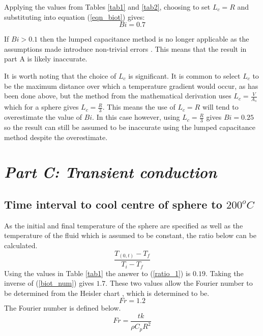 \documentclass[11pt]{article}
\begin{document}
Applying the values from Tables \ref{tab1} and \ref{tab2}, choosing to set $L_{c}=R$ and substituting into equation (\ref{eqn_biot}) gives:
\begin{equation}\label{biot_num}
	Bi = 0.7
\end{equation}

If $Bi > 0.1$ then the lumped capacitance method is no longer applicable as the assumptions made introduce non-trivial errors \cite{bergman_fundamentals_2011}. This means that the result in part A is likely inaccurate.

It is worth noting that the choice of $L_c$ is significant. It is common to select $L_c$ to be the maximum distance over which a temperature gradient would occur, as has been done above, but the method from the mathematical derivation uses $L_c = \frac{V}{A_s}$ which for a sphere gives $L_c = \frac{R}{3}$. This means the use of $L_c = R$ will tend to overestimate the value of $Bi$. In this case however, using $L_c = \frac{R}{3}$ gives $Bi = 0.25$ so the result can still be assumed to be inaccurate using the lumped capacitance method despite the overestimate.

\section{\emph{Part C: Transient conduction}}
\subsection{Time interval to cool centre of sphere to $200 ^{o}C$}
As the initial and final temperature of the sphere are specified as well as the temperature of the fluid which is assumed to be constant, the ratio below can be calculated.
\begin{equation}\label{ratio_1}
	\frac{T_{(0,t)} -T_{f}}{T_{i} - T_{f}}
\end{equation}
Using the values in Table \ref{tab1} the answer to (\ref{ratio_1}) is $0.19$. Taking the inverse of (\ref{biot_num}) gives $1.7$. These two values allow the Fourier number to be determined from the Heisler chart \cite{multidimensional-transient}, which is determined to be.
\begin{equation}\label{Fr_1}
	Fr = 1.2
\end{equation}
The Fourier number is defined below.
\begin{equation}\label{Fr_2}
	Fr = \frac{tk}{\rho C_{p} R^{2}}
\end{equation}
\end{document}
